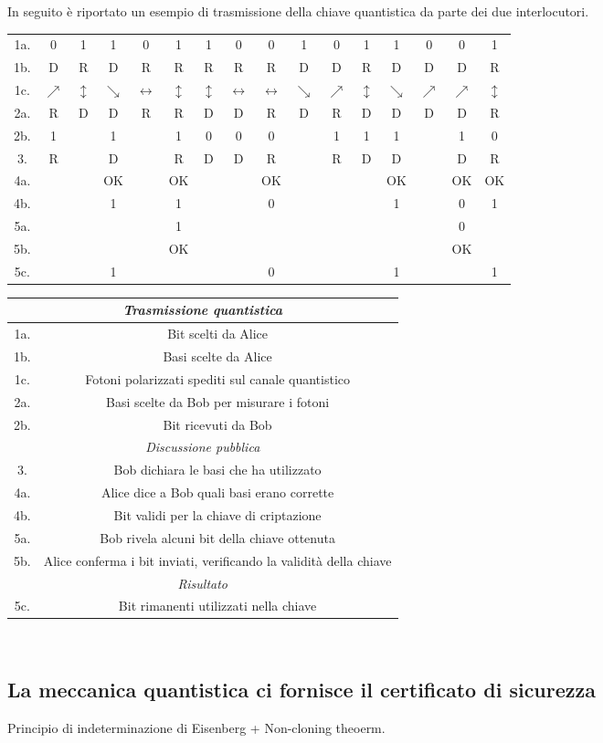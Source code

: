 \documentclass[italian,A4,12pt]{article}
\begin{document}
    In seguito è riportato un esempio di trasmissione della chiave quantistica da parte dei due interlocutori.
    \begin{center}
    \begin{tabular}{| c | c c c c c c c c c c c c c c c |}
      \hline
     1a.& 0 & 1 & 1 & 0 & 1 & 1 & 0 & 0 & 1 & 0 & 1 & 1 & 0 & 0 & 1\\
     1b.&D & R & D & R & R & R & R & R  & D & D & R & D & D & D & R\\
     1c. & $\nearrow$ & $\updownarrow$&$\searrow$ &$\leftrightarrow$ & $\updownarrow$& $\updownarrow$& $\leftrightarrow$&$\leftrightarrow$ & $\searrow$& $\nearrow$&$\updownarrow$&$\searrow$&$\nearrow$ & $\nearrow$ & $\updownarrow$ \\
     2a. & R&D&D&R&R&D&D&R&D&R&D&D&D&D&R\\
     2b. &1& &1& &1&0&0&0&&1&1&1&&1&0\\
     3. & R&&D&&R&D&D&R&&R&D&D&&D&R\\
     4a. &&&OK&&OK&&&OK&&&&OK&&OK&OK\\
     4b. &&&1&&1&&&0&&&&1&&0&1\\
     5a.&&&&&1&&&&&&&&&0&\\
     5b.&&&&&OK&&&&&&&&&OK&\\
     5c. &&&1&&&&&0&&&&1&&&1\\
      \hline
     \end{tabular}
    \end{center}

    \begin{center}
    \begin{tabular}{|c | c|}
      \hline
      \multicolumn{2}{|c|}{\textit{Trasmissione quantistica} }\\
      \hline
      1a.& Bit scelti da Alice\\
      1b.&Basi scelte da Alice\\
      1c. & Fotoni polarizzati spediti sul canale quantistico\\
      2a.& Basi scelte da Bob per misurare i fotoni\\
      2b.&Bit ricevuti da Bob\\
      \hline
      \multicolumn{2}{|c|}{\textit{Discussione pubblica}}\\
      \hline
      3. & Bob dichiara le basi che ha utilizzato\\
      4a.  & Alice dice a Bob quali basi erano corrette \\
      4b. & Bit validi per la chiave di criptazione\\
      5a. &Bob rivela alcuni bit della chiave ottenuta\\
      5b. & Alice conferma i bit inviati, verificando la validità della chiave\\
      \hline
      \multicolumn{2}{|c|}{\textit{Risultato}}\\
      \hline
      5c.& Bit rimanenti utilizzati nella chiave\\
      \hline
    \end{tabular}
    \end{center}
    ~
    \subsection{La meccanica quantistica ci fornisce il certificato di sicurezza}
    Principio di indeterminazione di Eisenberg + Non-cloning theoerm.
\end{document}
